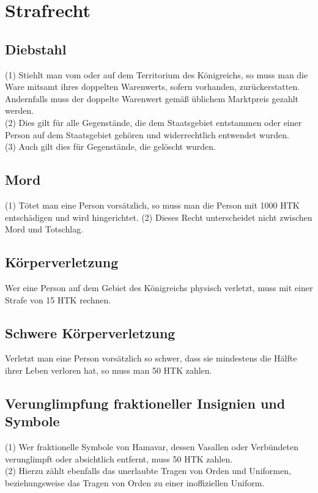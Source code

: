 \documentclass{article}
\begin{document}
\section{Strafrecht}
\subsection{Diebstahl}
(1) Stiehlt man vom oder auf dem Territorium des Königreichs, so muss man die Ware mitsamt ihres doppelten Warenwerts, sofern vorhanden, zurückerstatten. Andernfalls muss der doppelte Warenwert gemäß üblichem Marktpreis gezahlt werden.\\
(2) Dies gilt für alle Gegenstände, die dem Staatsgebiet entstammen oder einer Person auf dem Staatsgebiet gehören und widerrechtlich entwendet wurden.\\
(3) Auch gilt dies für Gegenstände, die gelöscht wurden.

\subsection{Mord}
(1) Tötet man eine Person vorsätzlich, so muss man die Person mit 1000 HTK entschädigen und wird hingerichtet.
(2) Dieses Recht unterscheidet nicht zwischen Mord und Totschlag.

\subsection{Körperverletzung}
Wer eine Person auf dem Gebiet des Königreichs physisch verletzt, muss mit einer Strafe von 15 HTK rechnen.

\subsection{Schwere Körperverletzung}
Verletzt man eine Person vorsätzlich so schwer, dass sie mindestens die Hälfte ihrer Leben verloren hat, so muss man 50 HTK zahlen.

\subsection{Verunglimpfung fraktioneller Insignien und Symbole}
(1) Wer fraktionelle Symbole von Hamavar, dessen Vasallen oder Verbündeten verunglimpft oder absichtlich entfernt, muss 50 HTK zahlen.\\
(2) Hierzu zählt ebenfalls das unerlaubte Tragen von Orden und Uniformen, beziehungsweise das Tragen von Orden zu einer inoffiziellen Uniform.
\end{document}
